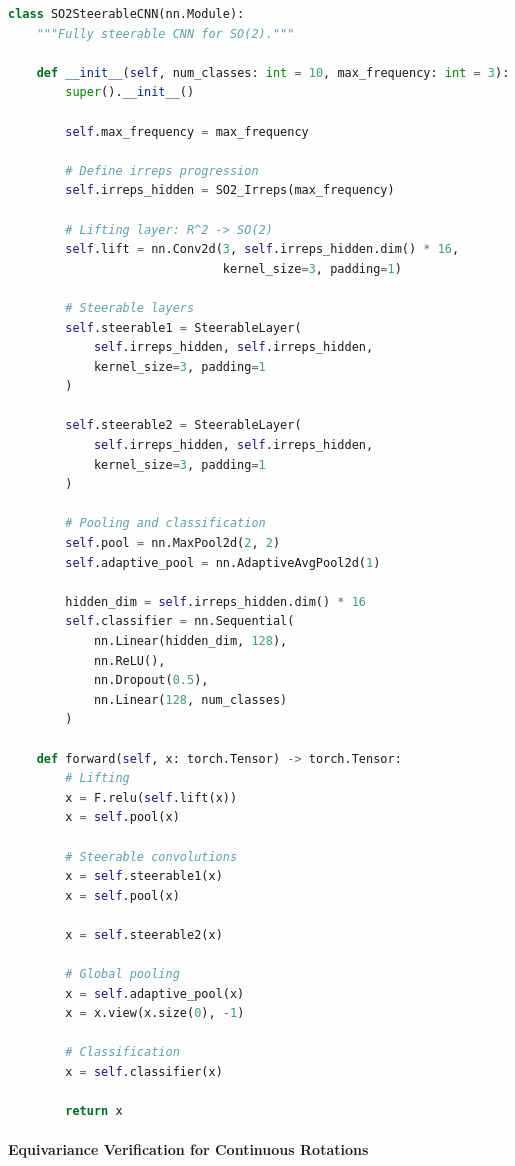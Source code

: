 \begin{listing}[h]
\begin{lstlisting}[language=Python]
class SO2SteerableCNN(nn.Module):
    """Fully steerable CNN for SO(2)."""

    def __init__(self, num_classes: int = 10, max_frequency: int = 3):
        super().__init__()

        self.max_frequency = max_frequency

        # Define irreps progression
        self.irreps_hidden = SO2_Irreps(max_frequency)

        # Lifting layer: R^2 -> SO(2)
        self.lift = nn.Conv2d(3, self.irreps_hidden.dim() * 16,
                              kernel_size=3, padding=1)

        # Steerable layers
        self.steerable1 = SteerableLayer(
            self.irreps_hidden, self.irreps_hidden,
            kernel_size=3, padding=1
        )

        self.steerable2 = SteerableLayer(
            self.irreps_hidden, self.irreps_hidden,
            kernel_size=3, padding=1
        )

        # Pooling and classification
        self.pool = nn.MaxPool2d(2, 2)
        self.adaptive_pool = nn.AdaptiveAvgPool2d(1)

        hidden_dim = self.irreps_hidden.dim() * 16
        self.classifier = nn.Sequential(
            nn.Linear(hidden_dim, 128),
            nn.ReLU(),
            nn.Dropout(0.5),
            nn.Linear(128, num_classes)
        )

    def forward(self, x: torch.Tensor) -> torch.Tensor:
        # Lifting
        x = F.relu(self.lift(x))
        x = self.pool(x)

        # Steerable convolutions
        x = self.steerable1(x)
        x = self.pool(x)

        x = self.steerable2(x)

        # Global pooling
        x = self.adaptive_pool(x)
        x = x.view(x.size(0), -1)

        # Classification
        x = self.classifier(x)

        return x
\end{lstlisting}
\caption{Complete SO(2) Steerable CNN architecture}
\label{code:so2_steerable_cnn}
\end{listing}

\paragraph{Equivariance Verification for Continuous Rotations}

